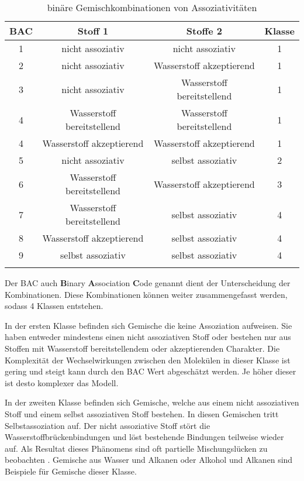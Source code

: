 \documentclass[../thesis.tex]{subfiles}
\begin{document}
\begin{table} [htb]
	\centering
	\caption{binäre Gemischkombinationen von Assoziativitäten}
	\begin{tabular}{ cccc }
		\hline 
		BAC & Stoff 1 & Stoffe 2 & Klasse\\
		\hline %
		1  & nicht assoziativ & nicht assoziativ & 1 \\
		2  & nicht assoziativ & Wasserstoff akzeptierend & 1 \\
		3  & nicht assoziativ & Wasserstoff bereitstellend & 1 \\
		4  & Wasserstoff bereitstellend & Wasserstoff bereitstellend & 1 \\
		4  & Wasserstoff akzeptierend & Wasserstoff akzeptierend & 1 \\
		5  & nicht assoziativ & selbst assoziativ & 2 \\
		6  & Wasserstoff bereitstellend & Wasserstoff akzeptierend & 3 \\
		7  & Wasserstoff bereitstellend & selbst assoziativ & 4 \\
		8  & Wasserstoff akzeptierend & selbst assoziativ & 4 \\
		9  & selbst assoziativ & selbst assoziativ & 4 \\
		\hline
		\label{tab: bin-bac}
	\end{tabular}
\end{table}

Der BAC auch \textbf{B}inary \textbf{A}ssociation \textbf{C}ode genannt dient der Unterscheidung der Kombinationen. Diese Kombinationen können weiter zusammengefasst werden, sodass 4 Klassen entstehen.

In der ersten Klasse befinden sich Gemische die keine Assoziation aufweisen. Sie haben entweder mindestens einen nicht assoziativen Stoff oder bestehen nur aus Stoffen mit Wasserstoff bereitstellendem oder akzeptierenden Charakter. Die Komplexität der Wechselwirkungen zwischen den Molekülen in dieser Klasse ist gering und steigt kann durch den BAC Wert abgeschätzt werden. Je höher dieser ist desto komplexer das Modell.

In der zweiten Klasse befinden sich Gemische, welche aus einem nicht assoziativen Stoff und einem selbst assoziativen Stoff bestehen. In diesen Gemischen tritt Selbstassoziation auf. Der nicht assoziative Stoff stört die Wasserstoffbrückenbindungen und löst bestehende Bindungen teilweise wieder auf. Als Resultat dieses Phänomens sind oft partielle Mischungslücken zu beobachten \cite{jaubert2020benchmark}. Gemische aus Wasser und Alkanen oder Alkohol und Alkanen sind Beispiele für Gemische dieser Klasse.
\end{document}
